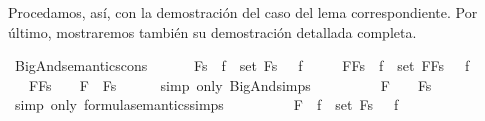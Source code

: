 \begin{isabellebody}
\begin{isamarkuptext}
  Procedamos, así, con la demostración del caso del lema 
  correspondiente. Por último, mostraremos también su demostración
  detallada completa.%
\end{isamarkuptext}\isamarkuptrue%
\isamarkupfalse%
\ BigAnd{\isacharunderscore}semantics{\isacharunderscore}cons{\isacharcolon}\ \isanewline
\ \ \ {\isachardoublequoteopen}{\isacharparenleft}{\isasymA}\ {\isasymTurnstile}\ \isactrlbold {\isasymAnd}Fs{\isacharparenright}\ {\isasymlongleftrightarrow}\ {\isacharparenleft}{\isasymforall}f\ {\isasymin}\ set\ Fs{\isachardot}\ {\isasymA}\ {\isasymTurnstile}\ f{\isacharparenright}{\isachardoublequoteclose}\isanewline
\ \ \ {\isachardoublequoteopen}{\isacharparenleft}{\isasymA}\ {\isasymTurnstile}\ \isactrlbold {\isasymAnd}{\isacharparenleft}F{\isacharhash}Fs{\isacharparenright}{\isacharparenright}\ {\isasymlongleftrightarrow}\ {\isacharparenleft}{\isasymforall}f\ {\isasymin}\ set\ {\isacharparenleft}F{\isacharhash}Fs{\isacharparenright}{\isachardot}\ {\isasymA}\ {\isasymTurnstile}\ f{\isacharparenright}{\isachardoublequoteclose}\isanewline
%
\isadelimproof
%
\endisadelimproof
%
\isatagproof
{}\isamarkupfalse%
\ {\isacharminus}\isanewline
\ \ \isamarkupfalse%
\ {\isachardoublequoteopen}{\isacharparenleft}{\isasymA}\ {\isasymTurnstile}\ \isactrlbold {\isasymAnd}{\isacharparenleft}F{\isacharhash}Fs{\isacharparenright}{\isacharparenright}\ {\isacharequal}\ {\isasymA}\ {\isasymTurnstile}\ F\ \isactrlbold {\isasymand}\ \isactrlbold {\isasymAnd}Fs{\isachardoublequoteclose}\isanewline
\ \ \ \ \isamarkupfalse%
\ {\isacharparenleft}simp\ only{\isacharcolon}\ BigAnd{\isachardot}simps{\isacharparenleft}{}{\isacharparenright}{\isacharparenright}\isanewline
\ \ \isamarkupfalse%
\ \isamarkupfalse%
\ {\isachardoublequoteopen}{\isasymdots}\ {\isacharequal}\ {\isacharparenleft}{\isasymA}\ {\isasymTurnstile}\ F\ {\isasymand}\ {\isasymA}\ {\isasymTurnstile}\ \isactrlbold {\isasymAnd}Fs{\isacharparenright}{\isachardoublequoteclose}\isanewline
\ \ \ \ \isamarkupfalse%
\ {\isacharparenleft}simp\ only{\isacharcolon}\ formula{\isacharunderscore}semantics{\isachardot}simps{\isacharparenleft}{}{\isacharparenright}{\isacharparenright}\isanewline
\ \ \isamarkupfalse%
\ \isamarkupfalse%
\ {\isachardoublequoteopen}{\isasymdots}\ {\isacharequal}\ {\isacharparenleft}{\isasymA}\ {\isasymTurnstile}\ F\ {\isasymand}\ {\isacharparenleft}{\isasymforall}f\ {\isasymin}\ set\ Fs{\isachardot}\ {\isasymA}\ {\isasymTurnstile}\ f{\isacharparenright}{\isacharparenright}{\isachardoublequoteclose}\isanewline

\end{isabellebody}
